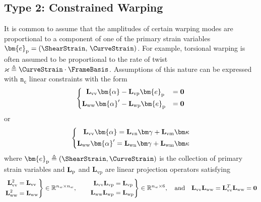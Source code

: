 


\subsection{Type 2: Constrained Warping}

It is common to assume that the amplitudes of certain warping modes are proportional to a component of one of the primary strain variables \(\bm{e}_{\rm p} = (\ShearStrain,\,\CurveStrain)\). 
For example, torsional warping is often assumed to be proportional to the rate of twist \(\varkappa \triangleq \CurveStrain\cdot \FrameBasis\).
Assumptions of this nature can be expressed with \(\mathtt{n_c}\) linear constraints with the form 
%
\begin{equation}
\left\{
\begin{aligned}
\mathbf{L}_{\rm vv}\bm{\alpha} &- \mathbf{L}_{\rm{vp}}\bm{e}_{\rm{p}} &= \mathbf{0} \\
\mathbf{L}_{\rm ww}\bm{\alpha}' &- \mathbf{L}_{\rm{wp}} \bm{e}_{\rm p} &= \mathbf{0}
\end{aligned}\right.
\end{equation}
or
\[
\left\{
\begin{aligned}
    \mathbf{L}_{\rm vv}\bm{\alpha} = \mathbf{L}_{\rm vn} \bm\gamma + \mathbf{L}_{\rm vm}\bm\kappa \\
    \mathbf{L}_{\rm ww}\bm{\alpha}' = \mathbf{L}_{\rm wn} \bm\gamma + \mathbf{L}_{\rm wm}\bm\kappa \\
\end{aligned}
\right.
\]
%
where \(\bm{e}_{\rm p} \triangleq (\ShearStrain, \CurveStrain)\) is the collection of primary strain variables and \(\mathbf{L}_{\rm p}\) and \(\mathbf{L}_{\mathrm{vp}}\) are linear projection operators satisfying
\[
\left.
\begin{aligned}
\mathbf{L}_{\rm vv}^2 &= \mathbf{L}_{\rm vv}\\
\mathbf{L}_{\rm ww}^2 &= \mathbf{L}_{\rm ww} \\
\end{aligned}\right\}\in\mathbb{R}^{n_w\times n_w},
\qquad
\left.
\begin{aligned}
\mathbf{L}_{\rm vv}\mathbf{L}_{\rm vp} &= \mathbf{L}_{\rm vp} \\
\mathbf{L}_{\rm ww}\mathbf{L}_{\rm wp} &= \mathbf{L}_{\rm wp}\\
\end{aligned}
\right\}\in\mathbb{R}^{n_w\times 6},
\quad\text{and}\quad
\mathbf{L}_{\rm vv}\mathbf{L}_{\rm ww} = \mathbf{L}_{\rm vv}^T\mathbf{L}_{\rm ww} = \mathbf{0}
\]


